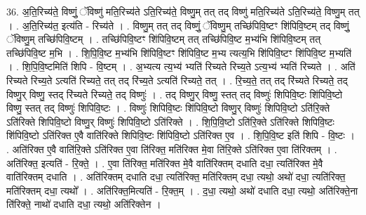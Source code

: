 \documentclass[17pt]{extarticle}
\begin{document}
36. अ॒ति॒रिच्य॑ते॒ विष्णुं॒ ॅविष्णु॑ मति॒रिच्य॑ते ऽति॒रिच्य॑ते॒ विष्णु॒म् तत् तद् विष्णु॑ मति॒रिच्य॑ते ऽति॒रिच्य॑ते॒ विष्णु॒म् तत् । . अ॒ति॒रिच्य॑त॒ इत्य॑ति - रिच्य॑ते । . विष्णु॒म् तत् तद् विष्णुं॒ ॅविष्णु॒म् तच्छि॑पिवि॒ष्टꣳ शि॑पिवि॒ष्टम् तद् विष्णुं॒ ॅविष्णु॒म् तच्छि॑पिवि॒ष्टम् । . तच्छि॑पिवि॒ष्टꣳ शि॑पिवि॒ष्टम् तत् तच्छि॑पिवि॒ष्ट म॒भ्य॑भि शि॑पिवि॒ष्टम् तत् तच्छि॑पिवि॒ष्ट म॒भि । . शि॒पि॒वि॒ष्ट म॒भ्य॑भि शि॑पिवि॒ष्टꣳ शि॑पिवि॒ष्ट म॒भ्य त्यत्य॒भि शि॑पिवि॒ष्टꣳ शि॑पिवि॒ष्ट म॒भ्यति॑ । . शि॒पि॒वि॒ष्टमिति॑ शिपि - वि॒ष्टम् । . अ॒भ्यत्य त्य॒भ्य॑ भ्यति॑ रिच्यते रिच्य॒ते ऽत्य॒भ्य॑ भ्यति॑ रिच्यते । . अति॑ रिच्यते रिच्य॒ते ऽत्यति॑ रिच्यते॒ तत् तद् रि॑च्य॒ते ऽत्यति॑ रिच्यते॒ तत् । . रि॒च्य॒ते॒ तत् तद् रि॑च्यते रिच्यते॒ तद् विष्णु॒र् विष्णु॒ स्तद् रि॑च्यते रिच्यते॒ तद् विष्णुः॑ । . तद् विष्णु॒र् विष्णु॒ स्तत् तद् विष्णुः॑ शिपिवि॒ष्टः शि॑पिवि॒ष्टो विष्णु॒ स्तत् तद् विष्णुः॑ शिपिवि॒ष्टः । . विष्णुः॑ शिपिवि॒ष्टः शि॑पिवि॒ष्टो विष्णु॒र् विष्णुः॑ शिपिवि॒ष्टो ऽति॑रि॒क्ते ऽति॑रिक्ते शिपिवि॒ष्टो विष्णु॒र् विष्णुः॑ शिपिवि॒ष्टो ऽति॑रिक्ते । . शि॒पि॒वि॒ष्टो ऽति॑रि॒क्ते ऽति॑रिक्ते शिपिवि॒ष्टः शि॑पिवि॒ष्टो ऽति॑रिक्त ए॒वै वाति॑रिक्ते शिपिवि॒ष्टः शि॑पिवि॒ष्टो ऽति॑रिक्त ए॒व । . शि॒पि॒वि॒ष्ट इति॑ शिपि - वि॒ष्टः । . अति॑रिक्त ए॒वै वाति॑रि॒क्ते ऽति॑रिक्त ए॒वा ति॑रिक्त॒ मति॑रिक्त मे॒वा ति॑रि॒क्ते ऽति॑रिक्त ए॒वा ति॑रिक्तम् । . अति॑रिक्त॒ इत्यति॑ - रि॒क्ते॒ । . ए॒वा ति॑रिक्त॒ मति॑रिक्त मे॒वै वाति॑रिक्तम् दधाति दधा॒ त्यति॑रिक्त मे॒वै वाति॑रिक्तम् दधाति । . अति॑रिक्तम् दधाति दधा॒ त्यति॑रिक्त॒ मति॑रिक्तम् दधा॒ त्यथो॒ अथो॑ दधा॒ त्यति॑रिक्त॒ मति॑रिक्तम् दधा॒ त्यथो᳚ । . अति॑रिक्त॒मित्यति॑ - रि॒क्त॒म् । . द॒धा॒ त्यथो॒ अथो॑ दधाति दधा॒ त्यथो॒ अति॑रिक्ते॒ना ति॑रिक्ते॒ नाथो॑ दधाति दधा॒ त्यथो॒ अति॑रिक्तेन । \newline
\end{document}
